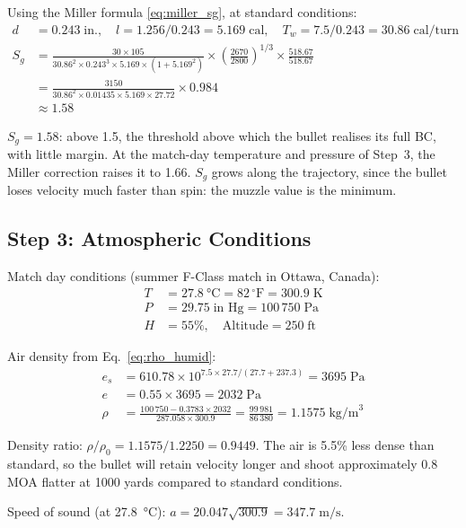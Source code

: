 \documentclass[11pt,twoside,openright]{report}
\newcommand{\degF}{\ensuremath{{}^{\circ}\mathrm{F}}}
\begin{document}
Using the Miller formula \eqref{eq:miller_sg}, at standard conditions:
\begin{align*}
  d &= 0.243\;\text{in.}, \quad l = 1.256/0.243 = 5.169\;\text{cal}, \quad T_w = 7.5/0.243 = 30.86\;\text{cal/turn} \\
  S_g &= \frac{30 \times 105}{30.86^2 \times 0.243^3 \times 5.169 \times (1 + 5.169^2)} \times \left(\frac{2670}{2800}\right)^{1/3} \times \frac{518.67}{518.67} \\
  &= \frac{3150}{30.86^2 \times 0.01435 \times 5.169 \times 27.72} \times 0.984 \\
  &\approx 1.58
\end{align*}

$S_g = 1.58$: above 1.5, the threshold above which the bullet realises its full BC, with little margin. At the match-day temperature and pressure of Step~3, the Miller correction raises it to 1.66. $S_g$ grows along the trajectory, since the bullet loses velocity much faster than spin: the muzzle value is the minimum.

\subsection{Step 3: Atmospheric Conditions}

Match day conditions (summer F-Class match in Ottawa, Canada):
\begin{align*}
  T &= \SI{27.8}{\celsius} = 82\,\degF = 300.9\;\text{K} \\
  P &= 29.75\;\text{in Hg} = 100\,750\;\text{Pa} \\
  H &= 55\%, \quad \text{Altitude} = 250\;\text{ft}
\end{align*}

Air density from Eq.~\eqref{eq:rho_humid}:
\begin{align*}
  e_s &= 610.78 \times 10^{7.5 \times 27.7 / (27.7 + 237.3)} = 3695\;\text{Pa} \\
  e &= 0.55 \times 3695 = 2032\;\text{Pa} \\
  \rho &= \frac{100\,750 - 0.3783 \times 2032}{287.058 \times 300.9} = \frac{99\,981}{86\,380} = 1.1575\;\text{kg/m}^3
\end{align*}

Density ratio: $\rho/\rho_0 = 1.1575/1.2250 = 0.9449$. The air is 5.5\% less dense than standard, so the bullet will retain velocity longer and shoot approximately 0.8 MOA flatter at 1000 yards compared to standard conditions.

Speed of sound (at \SI{27.8}{\celsius}): $a = 20.047\sqrt{300.9} = 347.7\;\text{m/s}$.
\end{document}

